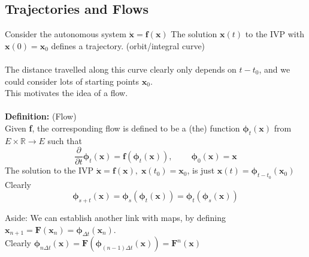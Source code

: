 \documentclass{article}
\newcommand{\bp}{\bm{\phi}}   %
\begin{document}
\subsection{Trajectories and Flows}
Consider the autonomous system
$ \dot{\textbf{x}} = \textbf{f}(\textbf{x}) $
The solution $\textbf{x}(t)$ to the IVP with $\textbf{x}(0) = \textbf{x}_0$
defines a trajectory. (orbit/integral curve)
\\
\\
The distance travelled along this curve clearly only depends on $t - t_0$, 
and we could consider lots of starting points $\textbf{x}_0$.
\\
This motivates the idea of a flow. 
\\
\\
\textbf{Definition:} (Flow) \\
Given \textbf{f}, the corresponding flow is defined to be a (the) function
$\bp_t (\textbf{x}) $ from $E \times \mathbb{R} \to E$ such that
\[ 
\frac{\partial}{\partial t} \bp_t ( \bm{x} ) = \bm{f}(\bp_t (\bm{x} ) ), \qquad\
\bp_0(\bm{x}) = \bm{x} 
 \]
The solution to the IVP $\dot{\bm{x}} = \bm{f}(\bm{x}), \; \bm{x}(t_0) = \bm{x}_0$,
is just $\bm{x}(t) = \bp_{t - t_0} (\bm{x}_0)$
\\
Clearly 
\[ \bp_{s+t}(\bm{x}) = \bp_s(\bp_t(\bm{x})) = \bp_t ( \bp_s (\bm{x} ) ) \]
\begin{framed}
\noindent Aside: We can establish another link with maps, by defining 
$\bm{x}_{n+1} = \bm{F}(\bm{x}_n) = \bp_{\Delta t} (\bm{x}_n)$. \\
Clearly $\bp_{n \Delta t} (\bm{x} ) = \bm{F} ( \bp_{(n-1) \Delta t} (\bm{x} )) = \bm{F}^n(\bm{x}) $ 
\end{framed}
\end{document}
